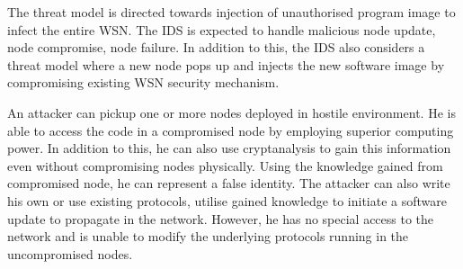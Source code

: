 \documentclass[conference]{IEEEtran}
\newcommand{\notedme}[1]{\raisebox{0pt}[0pt][0pt]{\pdfcomment[open=true,color=blue]{#1}}}
\begin{document}
The threat model is directed towards injection of unauthorised program image to infect the entire WSN.
The IDS is expected to handle malicious node update, node compromise, node failure.
In addition to this, the IDS also considers a threat model where a new node pops up and injects the new software image by compromising existing WSN security mechanism.


An  attacker  can pickup one or more nodes deployed in hostile environment. 
He is able to access the code in a compromised node by employing superior computing power. 
In addition to this, he can also use cryptanalysis to gain this information even without compromising nodes physically.
Using the knowledge gained from compromised node, he can represent a false identity.
The attacker can also write his own or use existing protocols, utilise gained knowledge to initiate a software update to propagate in the network.
However, he has  no special  access to  the  network and is unable to modify the underlying protocols running in the uncompromised nodes.



\end{document}
